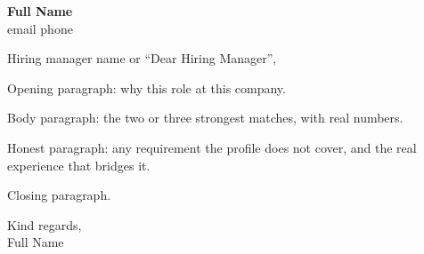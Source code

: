 \documentclass[11pt,a4paper]{article}
\begin{document}
\textbf{Full Name}\\
email \quad phone

Hiring manager name or ``Dear Hiring Manager'',

Opening paragraph: why this role at this company.

Body paragraph: the two or three strongest matches, with real numbers.

Honest paragraph: any requirement the profile does not cover, and the real experience that bridges it.

Closing paragraph.

Kind regards,\\
Full Name
\end{document}
